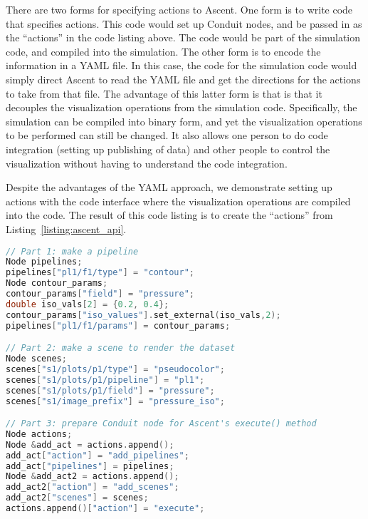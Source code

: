 There are two forms for specifying actions to Ascent.
%
One form is to write code that specifies actions.
%
This code would set up Conduit nodes, and be passed in as the ``actions'' in the
code listing above.
%
The code would be part of the simulation code, and compiled into the simulation.
%
The other form is to encode the information in a YAML file.
%
In this case, the code for the simulation code would simply direct Ascent to read
the YAML file and get the directions for the actions to take from that file.
%
The advantage of this latter form is that is that it decouples the visualization
operations from the simulation code.
%
Specifically, the simulation can be compiled into binary form, and yet the visualization
operations to be performed can still be changed.
%
It also allows one person to do code integration (setting up publishing of data)
and other people to control the visualization without having to understand
the code integration.

Despite the advantages of the YAML approach, we demonstrate setting up actions with
the code interface where the visualization operations are compiled into the code.
%
The result of this code listing is to create the ``actions'' from Listing~\ref{listing:ascent_api}.

\begin{lstlisting}[language=C++,caption={\label{listing:actions}Setting up Ascent actions using the C++ bindings.
%
This listing is broken into three parts.  
%
The first part makes a pipeline named ``pl1'' with one filter named ``f1.''
%
The second part makes a scene named ``s1'' which is connected to pipeline ``pl1.''
%
The third part tells Ascent to add the pipeline, add the scene, and then execute both.
}]
// Part 1: make a pipeline
Node pipelines;
pipelines["pl1/f1/type"] = "contour";
Node contour_params;
contour_params["field"] = "pressure";
double iso_vals[2] = {0.2, 0.4};
contour_params["iso_values"].set_external(iso_vals,2);
pipelines["pl1/f1/params"] = contour_params;

// Part 2: make a scene to render the dataset
Node scenes;
scenes["s1/plots/p1/type"] = "pseudocolor";
scenes["s1/plots/p1/pipeline"] = "pl1";
scenes["s1/plots/p1/field"] = "pressure";
scenes["s1/image_prefix"] = "pressure_iso";

// Part 3: prepare Conduit node for Ascent's execute() method
Node actions;
Node &add_act = actions.append();
add_act["action"] = "add_pipelines";
add_act["pipelines"] = pipelines;
Node &add_act2 = actions.append();
add_act2["action"] = "add_scenes";
add_act2["scenes"] = scenes;
actions.append()["action"] = "execute";
\end{lstlisting}

